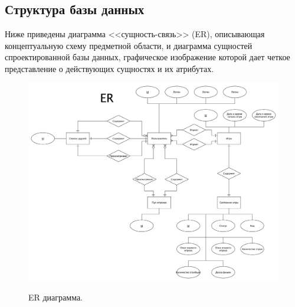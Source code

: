 \documentclass[a4paper,14pt]{extarticle}
\begin{document}
 	\newpage
 
 	\subsection{Структура базы данных}
 	
 	Ниже приведены диаграмма <<сущность-связь>> (ER), описывающая концептуальную схему предметной области, и диаграмма сущностей спроектированной базы данных, графическое изображение которой дает четкое представление о действующих сущностях и их атрибутах.
 	
 	\begin{figure}[h!]
 		\begin{center}
 			{\includegraphics[scale = 0.4]{img/er.pdf}}
 			\label{ris:er}
 		\end{center}
 		\caption{ER диаграмма.}
 	\end{figure}
 
 	\newpage
 
\end{document}
